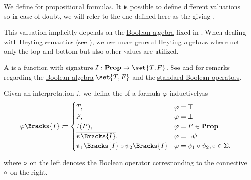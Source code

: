 \begin{definition}\label{def:propositional_valuation}
  We define  for propositional formulas. It is possible to define different valuations so in case of doubt, we will refer to the one defined here as the  giving .

  This valuation implicitly depends on the \hyperref[def:boolean_algebra]{Boolean algebra} fixed in . When dealing with Heyting semantics (see ), we use more general Heyting algebras where not only the top and bottom but also other values are utilized.

  \begin{thmenum}
     A  is a function with signature \( I: \boldop{Prop} \to \set{ T, F } \). See  and  for remarks regarding the \hyperref[def:boolean_algebra]{Boolean algebra} \( \set{ T, F } \) and the \hyperref[def:standard_boolean_operators]{standard Boolean operators}.

     Given an interpretation \( I \), we define the  of a formula \( \varphi \) inductively\IND as
    \begin{equation}\label{eq:def:propositional_valuation/formula_interpretation}
      \varphi\Bracks{I} \coloneqq \begin{cases}
        T,                                         &\varphi = \top \\
        F,                                         &\varphi = \bot \\
        I(P),                                      &\varphi = P \in \boldop{Prop} \\
        \overline{\psi\Bracks{I}},                 &\varphi = \neg \psi \\
        \psi_1\Bracks{I} \bincirc \psi_2\Bracks{I} &\varphi = \psi_1 \bincirc \psi_2, \bincirc \in \Sigma,
      \end{cases}
    \end{equation}
  \end{thmenum}
  where \( \mathbin {\circ} \) on the left denotes the \hyperref[def:standard_boolean_operators]{Boolean operator} corresponding to the connective \( \mathbin {\circ} \) on the right.
\end{definition}


